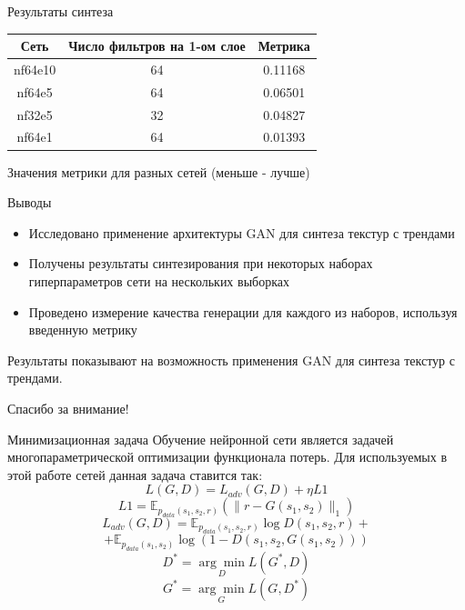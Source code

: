 \documentclass[12pt]{beamer}
\begin{document}
	\begin{frame}{Результаты синтеза}
		\begin{table}
			\begin{center}
				\begin{tabular}{|c|c|c|}
					\hline
					Сеть & Число фильтров на 1-ом слое & Метрика \\
					\hline
					nf64e10 & 64& 0.11168\\
					\hline
					nf64e5 & 64 & 0.06501\\
					\hline
					nf32e5 & 32 & 0.04827\\
					\hline
					nf64e1 & 64 & 0.01393\\
					\hline
				\end{tabular}
				\vfill
				Значения метрики для разных сетей (меньше - лучше)
			\end{center}
		\end{table}
	\end{frame}
	
	\begin{frame}{Выводы}
		\begin{itemize}
			\item Исследовано применение архитектуры GAN для синтеза текстур с трендами
			\item Получены результаты синтезирования при некоторых наборах гиперпараметров сети на нескольких выборках
			\item Проведено измерение качества генерации для каждого из наборов, используя введенную метрику
		\end{itemize}
		Результаты показывают на возможность применения GAN для синтеза текстур с трендами.
	\end{frame}
	
	\begin{frame}
		\centering\huge{Спасибо за внимание!}
	\end{frame}
	
	\begin{frame}{Минимизационная задача}
		Обучение нейронной сети является задачей многопараметрической оптимизации функционала потерь. Для используемых в этой работе сетей данная задача ставится так:
		 $$ L(G, D) = L_{adv}(G, D) + \eta L1$$
		 $$L1 = \mathbb{E}_{p_{data}(s_1, s_2, r)} (\parallel r - G(s_1, s_2) \parallel_1)$$
		 $$ L_{adv}(G, D) = \mathbb{E}_{p_{data}(s_1, s_2, r)}\log D(s_1, s_2, r)+ $$
		 $$ +  \mathbb{E}_{p_{data}(s_1, s_2)} \log (1 - D(s_1, s_2, G(s_1, s_2))) $$
		 $$ D^* = \underset{D}{\arg\min} L(G^*, D)  $$
		 $$ G^* = \underset{G}{\arg\min} L(G, D^*)  $$
	\end{frame}
	
\end{document}

